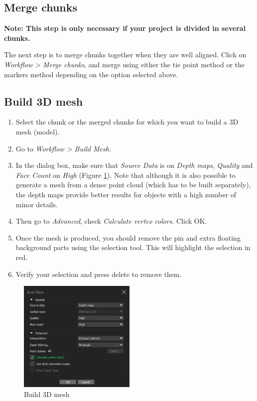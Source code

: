 \documentclass[10pt,letter,english]{article}
\begin{document}
\subsection{Merge chunks}

\noindent \textbf{Note: This step is only necessary if your project is divided in several chunks.}

The next step is to merge chunks together when they are well aligned. Click on \textit{Workflow > Merge chunks}, and merge using either the tie point method or the markers method depending on the option selected above.

\subsection{Build 3D mesh}
\begin{enumerate}
    \item Select the chunk or the merged chunks for which you want to build a 3D mesh (model).
    \item Go to \textit{Workflow > Build Mesh}.
    \item In the dialog box, make sure that \textit{Source Data} is on \textit{Depth maps}, \textit{Quality} and \textit{Face Count} on \textit{High} (Figure \ref{fig:3d_mesh}). Note that although it is also possible to generate a mesh from a dense point cloud (which has to be built separately), the depth maps provide better results for objects with a high number of minor details.
    \item Then go to \textit{Advanced}, check \textit{Calculate vertex colors}. Click OK.
    \item Once the mesh is produced, you should remove the pin and extra floating background parts using the selection tool. This will highlight the selection in red.
    \item Verify your selection and press delete to remove them.
\end{enumerate}

\begin{figure}[H]
    \centering
    \includegraphics[width=0.5\textwidth]{Figures/metashape_build_mesh.png}
    \caption{Build 3D mesh}
    \label{fig:3d_mesh}
\end{figure}
\end{document}
